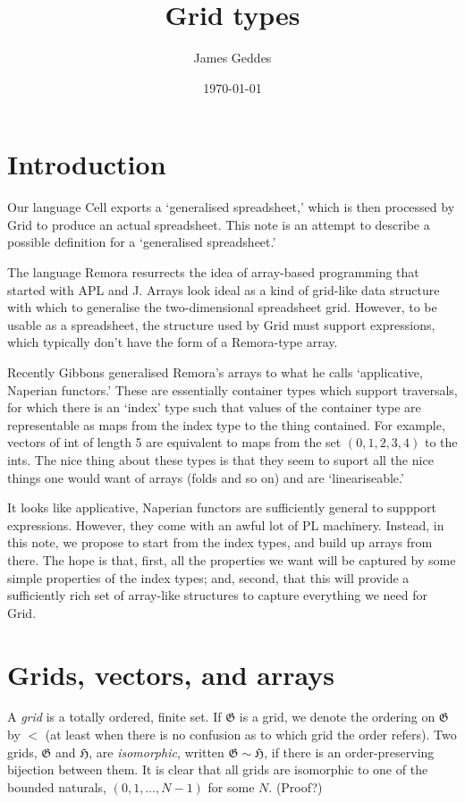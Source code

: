 \documentclass[11pt]{article}
\author{James Geddes}
\date{\today}
\title{Grid types}
\newcommand{\gr}[1]{\mathfrak{#1}}
\newcommand{\GG}{\gr{G}}
\begin{document}
\maketitle

\section{Introduction}

Our language Cell exports a `generalised spreadsheet,' which is then processed
by Grid to produce an actual spreadsheet. This note is an attempt to describe a
possible definition for a `generalised spreadsheet.'

The language Remora
\cite{slepak:array:2014,remora:intro:2019,slepak:semantics:2019} resurrects the
idea of array-based programming that started with APL and J. Arrays look ideal
as a kind of grid-like data structure with which to generalise the
two-dimensional spreadsheet grid. However, to be usable as a spreadsheet, the
structure used by Grid must support expressions, which typically don't have the
form of a Remora-type array.

Recently Gibbons \cite{gibbons:aplicative:2017} generalised Remora's arrays to
what he calls `applicative, Naperian functors.' These are essentially container
types which support traversals, for which there is an `index' type such that
values of the container type are representable as maps from the index type to
the thing contained. For example, vectors of int of length 5 are equivalent to
maps from the set \((0, 1, 2, 3, 4)\) to the ints. The nice thing about these
types is that they seem to suport all the nice things one would want of arrays
(folds and so on) and are `lineariseable.'

It looks like applicative, Naperian functors are sufficiently general to
suppport expressions. However, they come with an awful lot of PL
machinery. Instead, in this note, we propose to start from the index types, and
build up arrays from there. The hope is that, first, all the properties we want
will be captured by some simple properties of the index types; and, second, that
this will provide a sufficiently rich set of array-like structures to capture
everything we need for Grid.


\section{Grids, vectors, and arrays}

A \emph{grid} is a totally ordered, finite set. If \(\GG\) is a grid, we denote
the ordering on \(\GG\) by \(<\) (at least when there is no confusion as to
which grid the order refers). Two grids, \(\gr{G}\) and \(\gr{H}\), are
\emph{isomorphic}, written \(\gr{G}\sim \gr{H}\), if there is an order-preserving
bijection between them. It is clear that all grids are isomorphic to one of the
bounded naturals, \((0, 1, \dotsc, N-1)\) for some \(N\). (Proof?)
\end{document}
